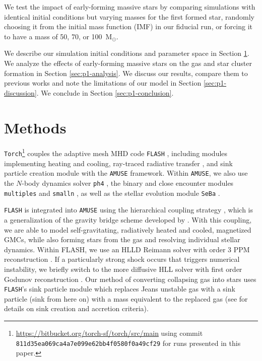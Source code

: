 \documentclass[twoside]{drexel-thesis}
\begin{document}
\begin{thesis}
We test the impact of early-forming massive stars by comparing simulations with identical initial conditions but varying masses for the first formed star, randomly choosing it from the initial mass function (IMF) in our fiducial run, or forcing it to have a mass of 50, 70, or 100~M$_\odot$.

We describe our simulation initial conditions and parameter space in Section \ref{sec:p1-methods}. We analyze the effects of early-forming massive stars on the gas and star cluster formation in Section \ref{sec:p1-analysis}. We discuss our results, compare them to previous works and note the limitations of our model in Section \ref{sec:p1-discussion}. We conclude in Section \ref{sec:p1-conclusion}. 


\section{Methods} \label{sec:p1-methods}

\texttt{Torch}\footnote{\url{https://bitbucket.org/torch-sf/torch/src/main} using commit \texttt{ 811d35ea069ca4a7e099e62bb4f0580f0a49cf29} for runs presented in this paper.} \citep{wall_collisional_2019} couples the adaptive mesh MHD code \texttt{FLASH} \citep{fryxell_flash_2000}, including modules implementing heating and cooling, ray-traced radiative transfer \citep{baczynski_fervent_2015}, and sink particle creation module \citep{federrath_modeling_2010-1} with the \texttt{AMUSE} framework. 
Within \texttt{AMUSE}, we also use the $N$-body dynamics solver \texttt{ph4} \citep{mcmillan_simulations_2012}, the binary and close encounter modules \texttt{multiples} \citep{portegies_zwart_astrophysical_2018} and \texttt{smalln} \citep{hut_building_1995,mcmillan_binary--single-star_1996}, as well as the stellar evolution module \texttt{SeBa} \citep{portegies_zwart_population_1996}.

\texttt{FLASH} is integrated into \texttt{AMUSE} using the hierarchical coupling strategy \citep{portegies_zwart_non-intrusive_2020}, which is a generalization of the gravity bridge scheme developed by \citet{fujii_bridge_2007}.
With this coupling, we are able to model self-gravitating, radiatively heated and cooled, magnetized GMCs, while also forming stars from the gas and resolving individual stellar dynamics. Within FLASH, we use an HLLD Reimann solver \citep{miyoshi_multi-state_2005} with order 3 PPM reconstruction \citep{colella_piecewise_1984}. If a particularly strong shock occurs that triggers numerical instability, we briefly switch to the more diffusive HLL solver \citep{einfeldt_godunov-type_1991} with first order Godunov reconstruction \citep{godunov_finite_1959}.
Our method of converting collapsing gas into stars uses \texttt{FLASH}'s sink particle module \citep{federrath_modeling_2010-1} which replaces Jeans unstable gas \citep{truelove_jeans_1997-1} with a sink particle (sink from here on) with a mass equivalent to the replaced gas (see \citealt{federrath_modeling_2010-1} for details on sink creation and accretion criteria). 


\end{thesis}
\end{document}
